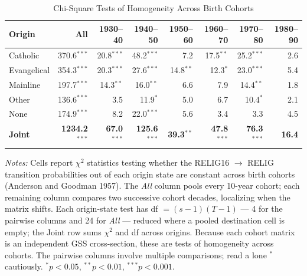\begin{table}[htbp]
\centering
\caption{Chi-Square Tests of Homogeneity Across Birth Cohorts}
\label{tab:homogeneity}
\begin{tabular}{lrrrrrrr}
\toprule
Origin & All & 1930--40 & 1940--50 & 1950--60 & 1960--70 & 1970--80 & 1980--90 \\
\midrule
Catholic & 370.6$^{***}$ & 20.8$^{***}$ & 48.2$^{***}$ & 7.2 & 17.5$^{**}$ & 25.2$^{***}$ & 2.6 \\
Evangelical & 354.3$^{***}$ & 20.3$^{***}$ & 27.6$^{***}$ & 14.8$^{**}$ & 12.3$^{*}$ & 23.0$^{***}$ & 5.4 \\
Mainline & 197.7$^{***}$ & 14.3$^{**}$ & 16.0$^{**}$ & 6.6 & 7.9 & 14.4$^{**}$ & 1.8 \\
Other & 136.6$^{***}$ & 3.5 & 11.9$^{*}$ & 5.0 & 6.7 & 10.4$^{*}$ & 2.1 \\
None & 174.9$^{***}$ & 8.2 & 22.0$^{***}$ & 5.6 & 3.4 & 3.3 & 4.5 \\
\midrule
\textbf{Joint} & \textbf{1234.2$^{***}$} & \textbf{67.0$^{***}$} & \textbf{125.6$^{***}$} & \textbf{39.3$^{**}$} & \textbf{47.8$^{***}$} & \textbf{76.3$^{***}$} & \textbf{16.4} \\
\bottomrule
\end{tabular}
\begin{minipage}{\linewidth}
\vspace{0.5em}\footnotesize
\textit{Notes:} Cells report $\chi^2$ statistics testing whether the RELIG16 $\to$ RELIG
transition probabilities out of each origin state are constant across birth cohorts
(Anderson and Goodman 1957). The \textit{All} column pools every 10-year cohort; each
remaining column compares two successive cohort decades, localizing when the matrix
shifts. Each origin-state test has df $= (s-1)(T-1)$ --- 4 for the pairwise columns and 24 for \textit{All} --- reduced where a pooled destination cell is empty; the
Joint row sums $\chi^2$ and df across origins. Because each cohort matrix is an independent
GSS cross-section, these are tests of homogeneity across cohorts. The pairwise columns
involve multiple comparisons; read a lone $^{*}$ cautiously.
$^{*}p<0.05$, $^{**}p<0.01$, $^{***}p<0.001$.
\end{minipage}
\end{table}
